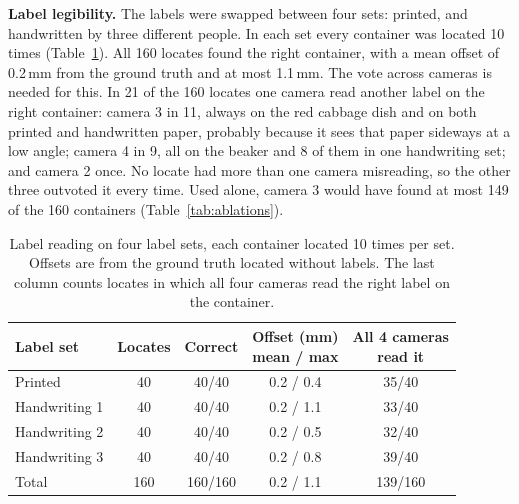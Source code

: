 \documentclass[letterpaper, 10pt, journal, twoside]{IEEEtran}}
\begin{document}
\textbf{Label legibility.} The labels were swapped between four sets:
printed, and handwritten by three different people. In each set every
container was located 10 times (Table~\ref{tab:label_reading}). All 160
locates found the right container, with a mean offset of 0.2\,mm from the
ground truth and at most 1.1\,mm. The vote across cameras is needed for
this. In 21 of the 160 locates one camera read another label on the right
container: camera 3 in 11, always on the red cabbage dish and on both
printed and handwritten paper, probably because it sees that paper
sideways at a low angle; camera 4 in 9, all on the beaker and 8 of them in
one handwriting set; and camera 2 once. No locate had more than one camera
misreading, so the other three outvoted it every time. Used alone, camera
3 would have found at most 149 of the 160 containers
(Table~\ref{tab:ablations}).

\begin{table}[t]
  \caption{Label reading on four label sets, each container located 10
  times per set. Offsets are from the ground truth located without
  labels. The last column counts locates in which all four cameras read
  the right label on the container.}
  \label{tab:label_reading}
  \centering
  \footnotesize
  \begin{tabular}{@{}lcccc@{}}
    \toprule
    Label set & Locates & Correct & \makecell{Offset (mm)\\mean / max} & \makecell{All 4 cameras\\read it} \\
    \midrule
    Printed       & 40  & 40/40   & 0.2 / 0.4 & 35/40 \\
    Handwriting 1 & 40  & 40/40   & 0.2 / 1.1 & 33/40 \\
    Handwriting 2 & 40  & 40/40   & 0.2 / 0.5 & 32/40 \\
    Handwriting 3 & 40  & 40/40   & 0.2 / 0.8 & 39/40 \\
    \midrule
    Total         & 160 & 160/160 & 0.2 / 1.1 & 139/160 \\
    \bottomrule
  \end{tabular}
\end{table}
\end{document}
